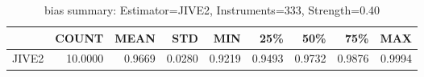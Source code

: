 \begin{table}[ht]
\centering
\caption{bias summary: Estimator=JIVE2, Instruments=333, Strength=0.40}
\begin{tabular}{lrrrrrrrr}
\toprule
 & COUNT & MEAN & STD & MIN & 25\% & 50\% & 75\% & MAX \\
\midrule
JIVE2 & 10.0000 & 0.9669 & 0.0280 & 0.9219 & 0.9493 & 0.9732 & 0.9876 & 0.9994 \\
\bottomrule
\end{tabular}
\end{table}
